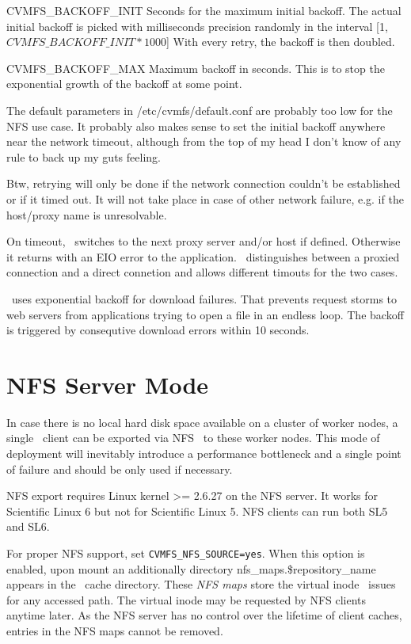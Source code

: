CVMFS\_BACKOFF\_INIT
Seconds for the maximum initial backoff.  The actual initial backoff is picked with milliseconds precision randomly in the interval [1, $CVMFS\_BACKOFF\_INIT*1000$]
With every retry, the backoff is then doubled.

CVMFS\_BACKOFF\_MAX
Maximum backoff in seconds.  This is to stop the exponential growth of the backoff at some point.

The default parameters in /etc/cvmfs/default.conf are probably too low for the NFS use case.  It probably also makes sense to set the initial backoff anywhere near the network timeout, although from the top of my head I don't know of any rule to back up my guts feeling.

Btw, retrying will only be done if the network connection couldn't be established or if it timed out.  It will not take place in case of other network failure, e.g. if the host/proxy name is unresolvable.  

On timeout, \cvmfs\ switches to the next proxy server and/or host if defined.
Otherwise it returns with an EIO error to the application.
\cvmfs\ distinguishes between a proxied connection and a direct connetion and allows different timouts for the two cases.

\cvmfs\ uses exponential backoff for download failures.
That prevents request storms to web servers from applications trying to open a file in an endless loop.
The backoff is triggered by consequtive download errors within 10 seconds.

\section{NFS Server Mode}
In case there is no local hard disk space available on a cluster of worker nodes, a single \cvmfs\ client can be exported via NFS~\cite{rfc1813,rfc3530} to these worker nodes.
This mode of deployment will inevitably introduce a performance bottleneck and a single point of failure and should be only used if necessary.

NFS export requires Linux kernel >= 2.6.27 on the NFS server. 
It works for Scientific Linux 6 but not for Scientific Linux 5. 
NFS clients can run both SL5 and SL6.

For proper NFS support, set \texttt{CVMFS\_NFS\_SOURCE=yes}. 
When this option is enabled, upon mount an additionally directory nfs\_maps.\$repository\_name appears in the \cvmfs\ cache directory.
These \emph{NFS maps} store the virtual inode \cvmfs\ issues for any accessed path.
The virtual inode may be requested by NFS clients anytime later.
As the NFS server has no control over the lifetime of client caches, entries in the NFS maps cannot be removed.


